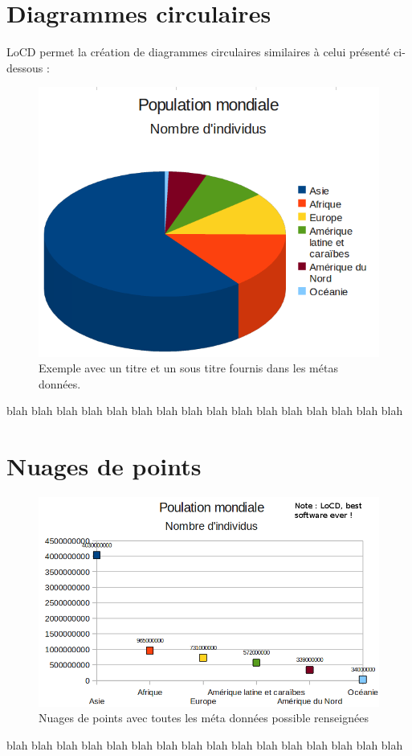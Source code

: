 \section{Diagrammes circulaires}
LoCD permet la création de diagrammes circulaires similaires  à celui présenté ci-dessous : 
\begin{figure}[htbp]
\centering
  \includegraphics[scale=0.40]{img/diagrammecirculaire}
  \caption{Exemple avec un titre et un sous titre fournis dans les métas données.}
  \label{fig:dcirculaire}
\end{figure}

 blah  blah  blah  blah  blah  blah  blah  blah  blah  blah  blah  blah  blah  blah  blah  blah 

\section{Nuages de points}
\begin{figure}[htbp]
\centering
  \includegraphics[scale=0.40]{img/diagrammenuages}
  \caption{Nuages de points avec toutes les méta données possible renseignées}
  \label{fig:dnuages}
\end{figure}  
  blah  blah  blah  blah  blah  blah  blah  blah  blah  blah  blah  blah  blah  blah  blah  blah 
  

